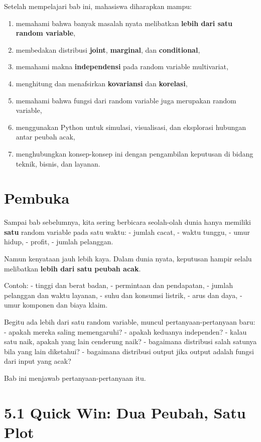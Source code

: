 \documentclass[
  letterpaper,
  DIV=11,
  numbers=noendperiod]{scrreprt}
\providecommand{\tightlist}{%
  \setlength{\itemsep}{0pt}\setlength{\parskip}{0pt}}
\begin{document}
Setelah mempelajari bab ini, mahasiswa diharapkan mampu:

\begin{enumerate}
\def\labelenumi{\arabic{enumi}.}
\tightlist
\item
  memahami bahwa banyak masalah nyata melibatkan \textbf{lebih dari satu
  random variable},
\item
  membedakan distribusi \textbf{joint}, \textbf{marginal}, dan
  \textbf{conditional},
\item
  memahami makna \textbf{independensi} pada random variable multivariat,
\item
  menghitung dan menafsirkan \textbf{kovariansi} dan \textbf{korelasi},
\item
  memahami bahwa fungsi dari random variable juga merupakan random
  variable,
\item
  menggunakan Python untuk simulasi, visualisasi, dan eksplorasi
  hubungan antar peubah acak,
\item
  menghubungkan konsep-konsep ini dengan pengambilan keputusan di bidang
  teknik, bisnis, dan layanan.
\end{enumerate}

\section{Pembuka}\label{pembuka-4}

Sampai bab sebelumnya, kita sering berbicara seolah-olah dunia hanya
memiliki \textbf{satu} random variable pada satu waktu: - jumlah cacat,
- waktu tunggu, - umur hidup, - profit, - jumlah pelanggan.

Namun kenyataan jauh lebih kaya. Dalam dunia nyata, keputusan hampir
selalu melibatkan \textbf{lebih dari satu peubah acak}.

Contoh: - tinggi dan berat badan, - permintaan dan pendapatan, - jumlah
pelanggan dan waktu layanan, - suhu dan konsumsi listrik, - arus dan
daya, - umur komponen dan biaya klaim.

Begitu ada lebih dari satu random variable, muncul pertanyaan-pertanyaan
baru: - apakah mereka saling memengaruhi? - apakah keduanya independen?
- kalau satu naik, apakah yang lain cenderung naik? - bagaimana
distribusi salah satunya bila yang lain diketahui? - bagaimana
distribusi output jika output adalah fungsi dari input yang acak?

Bab ini menjawab pertanyaan-pertanyaan itu.

\section{5.1 Quick Win: Dua Peubah, Satu
Plot}\label{quick-win-dua-peubah-satu-plot}
\end{document}
